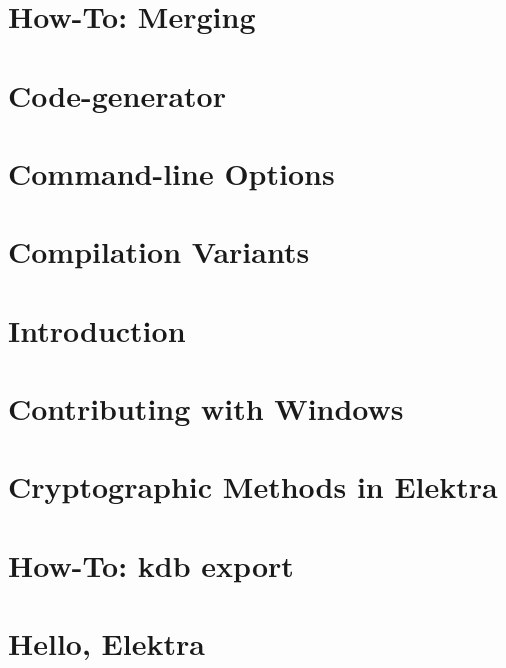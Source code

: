 \let\mypdfximage\pdfximage\def\pdfximage{\immediate\mypdfximage}\documentclass[twoside]{book}
\newcommand{\+}{\discretionary{\mbox{\scriptsize$\hookleftarrow$}}{}{}}
\begin{document}
\chapter{How-\/\+To\+: Merging}
\label{doc_tutorials_cmerge_md}

\chapter{Code-\/generator}
\label{doc_tutorials_code-generator_md}

\chapter{Command-\/line Options}
\label{doc_tutorials_command-line-options_md}

\chapter{Compilation Variants}
\label{doc_tutorials_compilation-variants_md}

\chapter{Introduction}
\label{doc_tutorials_contributing-clion_md}

\chapter{Contributing with Windows}
\label{doc_tutorials_contributing-windows_md}

\chapter{Cryptographic Methods in Elektra}
\label{doc_tutorials_crypto_md}

\chapter{How-\/\+To\+: kdb export}
\label{doc_tutorials_export_md}

\chapter{Hello, Elektra}
\label{doc_tutorials_hello-elektra_md}

\end{document}
